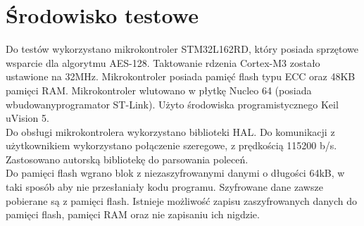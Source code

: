 \documentclass[a4paper, 10pt]{article}
\begin{document}
	\section{Środowisko testowe}
	Do testów wykorzystano mikrokontroler STM32L162RD\cite{bib:STM}, który posiada sprzętowe wsparcie dla algorytmu AES-128. Taktowanie rdzenia Cortex-M3 zostało ustawione na 32MHz. Mikrokontroler posiada pamięć flash typu ECC oraz 48KB pamięci RAM. Mikrokontroler wlutowano w płytkę Nucleo 64 (posiada wbudowanyprogramator ST-Link). Użyto środowiska programistycznego Keil uVision 5.\\
	Do obsługi mikrokontrolera wykorzystano biblioteki HAL. Do komunikacji z użytkownikiem wykorzystano połączenie szeregowe, z prędkością 115200 b/s. Zastosowano autorską bibliotekę do parsowania poleceń.\\
	Do pamięci flash wgrano blok z niezaszyfrowanymi danymi o długości 64kB, w taki sposób aby nie przesłaniały kodu programu. Szyfrowane dane zawsze pobierane są z pamięci flash. Istnieje możliwość zapisu zaszyfrowanych danych do pamięci flash, pamięci RAM oraz nie zapisaniu ich nigdzie.
	
\end{document}
